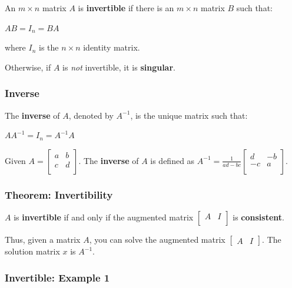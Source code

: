 \documentclass[12pt, letterpaper]{article}
\begin{document}
An $ m \times n $ matrix $ A $ is \textbf{invertible} if there is an
$ m \times n $ matrix $ B $ such that:

\medskip
{\centering

  $ AB = I_n = BA $

}
\medskip

where $ I_n $ is the $ n \times n $ identity matrix.
\medskip

Otherwise, if $ A $ is \textit{not} invertible, it is \textbf{singular}.

\subsubsection*{Inverse}

The \textbf{inverse} of $ A $, denoted by $ A^{-1} $, is the unique
matrix such that:

\medskip
{\centering

  $ AA^{-1} = I_n = A^{-1}A $

}
\medskip

Given
$ A =
\begin{bmatrix}
  a & b \\
  c & d \\
\end{bmatrix} $.
The \textbf{inverse} of $ A $ is defined as
$ \displaystyle A^{-1} = \frac{1}{ad - bc}
\begin{bmatrix}
  d & -b \\
  -c & a \\
\end{bmatrix} $.
\bigskip

\subsubsection*{Theorem: Invertibility}

$ A $ is \textbf{invertible} if and only if the augmented matrix
$
\begin{bmatrix}
  A & I \\
\end{bmatrix} $ is \textbf{consistent}.

Thus, given a matrix $ A $, you can solve the augmented matrix $
\begin{bmatrix} A & I
\end{bmatrix} $. The solution matrix $ x $ is $ A^{-1} $.

\subsubsection*{Invertible: Example 1}
\end{document}
